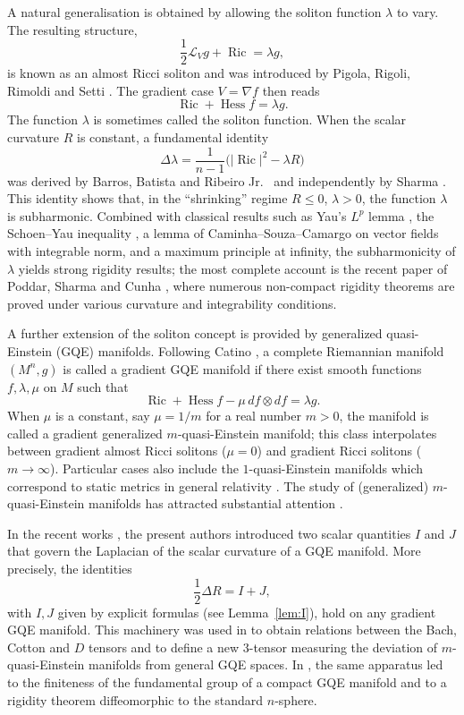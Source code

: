 \documentclass[12pt,a4paper]{article}
\newcommand{\Ric}{\operatorname{Ric}}
\newcommand{\Hess}{\operatorname{Hess}}
\theoremstyle{definition}
\theoremstyle{definition}
\begin{document}
A natural generalisation is obtained by allowing the soliton function $\lambda$ to vary.
The resulting structure,
\[
\frac12\mathcal{L}_Vg + \Ric = \lambda g,
\]
is known as an almost Ricci soliton and was introduced by Pigola, Rigoli, Rimoldi and Setti \cite{Pigola}.
The gradient case $V=\nabla f$ then reads
\begin{equation}
\Ric + \Hess f = \lambda g. \label{eq:almost}
\end{equation}
The function $\lambda$ is sometimes called the soliton function.
When the scalar curvature $R$ is constant, a fundamental identity
\[
\Delta \lambda = \frac{1}{n-1}\bigl(|\Ric|^2 - \lambda R\bigr)
\]
was derived by Barros, Batista and Ribeiro Jr.\ \cite{Barros} and independently by Sharma \cite{Sharma}.
This identity shows that, in the ``shrinking'' regime $R\le 0$, $\lambda>0$, the function $\lambda$ is subharmonic.
Combined with classical results such as Yau's $L^p$ lemma \cite{Yau}, the Schoen--Yau inequality \cite{SchoenYau}, a lemma of Caminha--Souza--Camargo \cite{Caminha} on vector fields with integrable norm, and a maximum principle at infinity, the subharmonicity of $\lambda$ yields strong rigidity results; the most complete account is the recent paper of Poddar, Sharma and Cunha \cite{Poddar}, where numerous non-compact rigidity theorems are proved under various curvature and integrability conditions.

A further extension of the soliton concept is provided by generalized quasi-Einstein (GQE) manifolds.
Following Catino \cite{Catino}, a complete Riemannian manifold $(M^n,g)$ is called a gradient GQE manifold if there exist smooth functions $f,\lambda,\mu$ on $M$ such that
\begin{equation}
\Ric + \Hess f - \mu\, df\otimes df = \lambda g. \label{eq:GQE}
\end{equation}
When $\mu$ is a constant, say $\mu = 1/m$ for a real number $m>0$, the manifold is called a gradient generalized $m$-quasi-Einstein manifold; this class interpolates between gradient almost Ricci solitons ($\mu=0$) and gradient Ricci solitons ($m\to\infty$).
Particular cases also include the $1$-quasi-Einstein manifolds which correspond to static metrics in general relativity \cite{Anderson}.
The study of (generalized) $m$-quasi-Einstein manifolds has attracted substantial attention \cite{BarrosRibeiro,Case,Hu,Huang}.

In the recent works \cite{Mir14,Mir15}, the present authors introduced two scalar quantities $I$ and $J$ that govern the Laplacian of the scalar curvature of a GQE manifold.
More precisely, the identities
\[
\frac12\Delta R = I + J,
\]
with $I,J$ given by explicit formulas (see Lemma~\ref{lem:I}), hold on any gradient GQE manifold.
This machinery was used in \cite{Mir14} to obtain relations between the Bach, Cotton and $D$ tensors and to define a new $3$-tensor measuring the deviation of $m$-quasi-Einstein manifolds from general GQE spaces.
In \cite{Mir15}, the same apparatus led to the finiteness of the fundamental group of a compact GQE manifold and to a rigidity theorem diffeomorphic to the standard $n$-sphere.
\end{document}
